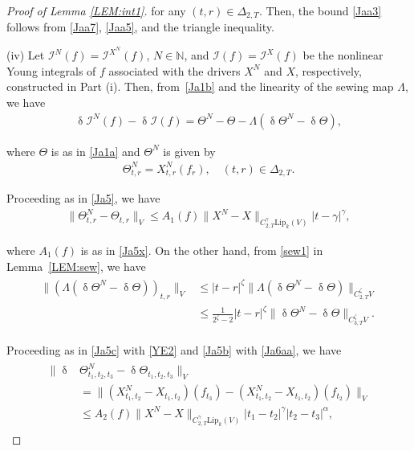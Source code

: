 \documentclass[letterpaper, 11pt,  reqno]{amsart}
\newcommand{\1}{\hspace{0.5mm}\text{I}\hspace{0.5mm}}
\newcommand{\I}{\mathcal{I}}
\newcommand{\noi}{\noindent}
\newcommand{\al}{\alpha}
\newcommand{\updl}{\updelta}
\newcommand{\Dl}{\Delta}
\newcommand{\g}{\gamma}
\newcommand{\Ld}{\Lambda}
\newcommand{\N}{\mathbb{N}}
\newcommand{\Lip}{\mathrm{Lip}}
\newcommand{\z}{\zeta}
\newcommand{\Ta}{\Theta}
\numberwithin{equation}{section}
\numberwithin{theorem}{section}
\begin{document}
\begin{proof}[Proof of Lemma \ref{LEM:int1}]
\noi
for any  $(t,r)\in \Dl_{2,T}$.
Then,
the bound \eqref{Jaa3} follows  from \eqref{Jaa7}, \eqref{Jaa5}, 
and the triangle inequality.


\medskip

\noi
(iv)
Let $\I^N(f) = \I^{X^N}(f)$, $N \in \N$, and $\I(f) = \I^X(f)$
be the nonlinear Young integrals of $f$ 
associated with the drivers
$X^N$ and $X$, respectively, 
constructed in Part (i).
Then, 
from~\eqref{Ja1b} and the linearity of the sewing map $\Ld$, we have 
\begin{align}
\updl \I^N(f) - \updl \I(f)  = \Ta^N - \Ta - \Ld  (\updl \Ta^N - \updl \Ta), 
\label{YE1}
\end{align}


\noi
where $\Ta$ is as in \eqref{Ja1a} and $\Ta^N$ is  given by 
\begin{align}
\Theta_{t,r}^N = X^N_{t,r}(f_r), 
  \quad (t,r)\in \Dl_{2,T}.
\label{YE2}
\end{align}


Proceeding as in \eqref{Ja5}, 
we have
\begin{align}
\| \Ta_{t, r}^N - \Ta_{t, r}\|_{V} 
\le A_1(f) \|X^N - X\|_{C^\g_{2,T}\Lip_k(V)}|t - \g|^\g, 
\label{YE3}
\end{align}

\noi
where $A_1(f)$ is as in \eqref{Ja5x}.
On the other hand, 
 from \eqref{sew1} in  Lemma~\ref{LEM:sew}, we have 
\begin{align}
\begin{split}
\|(\Lambda (\updl \Theta^N - \updl \Ta))_{t,r}\|_{V}
& \le 
|t-r|^{\z}
\|\Lambda (\updl \Theta^N - \updl \Ta)\|_{C^\z_{2,T} V}\\
& \le
\frac{1}{2^\z - 2}
|t-r|^{\z}
\| \updl \Theta^N - \updl \Ta\|_{C^\z_{3,T} V}.
\end{split}
\label{YE4}
\end{align}


\noi
Proceeding as in \eqref{Ja5c}
with  \eqref{YE2}
and \eqref{Ja5b} with \eqref{Ja6aa}, 
we have 
\begin{align}
\label{YE5}
\begin{aligned}
 \|  \updl & \Theta^N_{t_1, t_2, t_3} - \updl \Ta_{t_1,t_2,t_3}\|_{V}\\
& = \big\|
(X^N_{t_1,t_2} - X_{t_1,t_2}) (f_{t_3}) - (X^N_{t_1,t_2}- X_{t_1,t_2})(f_{t_2})
\big\|_{V}\\
 & \le A_2(f)
 \|X^N - X\|_{C^\g_{2,T}\Lip_k(V)}|t_1 - t_2|^\g 
 |t_2- t_3|^\al, 
\end{aligned}
\end{align}


\end{proof}
\end{document}
